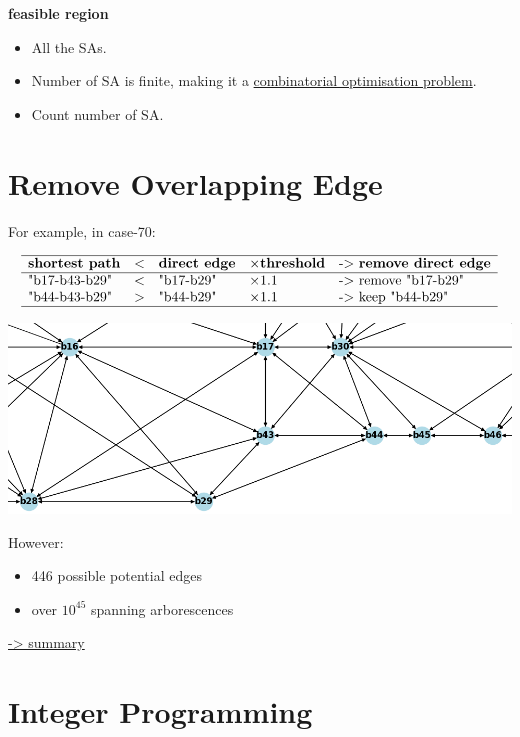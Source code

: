 \documentclass[
]{book}
\providecommand{\tightlist}{%
  \setlength{\itemsep}{0pt}\setlength{\parskip}{0pt}}
\begin{document}
\textbf{feasible region}

\begin{itemize}
\tightlist
\item
  All the SAs.
\item
  Number of SA is finite, making it a \protect\hyperlink{combinatorial}{combinatorial
  optimisation problem}.
\item
  Count number of SA.
\end{itemize}

\hypertarget{overlapping}{%
\section{Remove Overlapping Edge}\label{overlapping}}

For example, in case-70:

\[
\begin{array}{lllll}
  \hline
  \textbf{shortest path} & <
  & \textbf{direct edge} & \times \textbf{threshold}
  & \text{-> } \textbf{remove direct edge} \\
  \hline
  \text{"b17‐b43-b29"} & < & \text{"b17-b29"} & \times 1.1
  & \text{-> remove "b17-b29"} \\
  \text{"b44‐b43-b29"} & > & \text{"b44-b29"} & \times 1.1
  & \text{-> keep "b44-b29"} \\
  \hline
\end{array}
\]

\begin{center}\includegraphics[width=0.7\linewidth]{Pictures/overlapGeth} \end{center}

However:

\begin{itemize}
\tightlist
\item
  446 possible potential edges
\item
  over \(10^{45}\) spanning arborescences
\end{itemize}

\protect\hyperlink{summary}{-\textgreater{} summary}

\hypertarget{IP}{%
\section{Integer Programming}\label{IP}}
\end{document}
